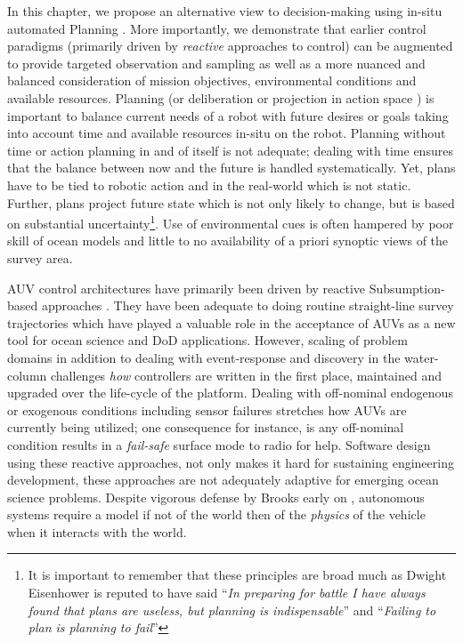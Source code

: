 In this chapter, we propose an alternative view to decision-making
using in-situ automated Planning \cite{ghallab04}. More importantly,
we demonstrate that earlier control paradigms (primarily driven by
\emph{reactive} approaches to control) can be augmented to provide
targeted observation and sampling as well as a more nuanced and
balanced consideration of mission objectives, environmental conditions
and available resources. Planning (or deliberation or projection in
action space ) is
important to balance current needs of a robot with future desires or
goals taking into account time and available resources in-situ on the
robot. Planning without time or action planning in and of itself is
not adequate; dealing with time ensures that the balance between now
and the future is handled systematically. Yet, plans have to be tied
to robotic action and in the real-world which is not static. Further,
plans project future state which is not only likely to change, but is
based on substantial uncertainty\footnote{It is important to remember
  that these principles are broad much as Dwight Eisenhower is reputed
  to have said ``\emph{In preparing for battle I have always found
    that plans are useless, but planning is indispensable}'' and
  ``\emph{Failing to plan is planning to fail}''}. Use of
environmental cues is often hampered by poor 
skill \cite{anderson2009} of ocean models and little to no
availability of a priori synoptic views of the survey
area. 


AUV control architectures have primarily been driven by reactive
Subsumption-based approaches \cite{brooks86}. They have been adequate
to doing routine straight-line survey trajectories which have played a
valuable role in the acceptance of AUVs as a new tool for ocean
science and DoD applications. However, scaling of problem domains in
addition to dealing with event-response and discovery in the
water-column challenges \emph{how} controllers are written in the
first place, maintained and upgraded over the life-cycle of the
platform. Dealing with off-nominal endogenous or exogenous conditions
including sensor failures stretches how AUVs are currently being
utilized; one consequence for instance, is any off-nominal condition
results in a \emph{fail-safe} surface mode to radio for help. Software
design using these reactive approaches, not only makes it hard for
sustaining engineering development, these approaches are not
adequately adaptive for emerging ocean science problems.  Despite
vigorous defense by Brooks early on
\cite{Brooks91intelligencewithoutrea,Brooks91intelligencewithoutrep},
autonomous systems require a model if not of the world then of the
\emph{physics} of the vehicle when it interacts with the world.


